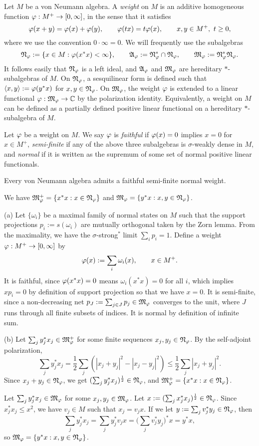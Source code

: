 \documentclass{../../large}
\begin{document}
\begin{prb}[Weights]
Let $M$ be a von Neumann algebra.
A \emph{weight} on $M$ is an additive homogeneous function $\varphi:M^+\to[0,\infty]$, in the sense that it satisfies
\[\varphi(x+y)=\varphi(x)+\varphi(y),\qquad\varphi(tx)=t\varphi(x),\qquad x,y\in M^+,\ t\ge0,\]
where we use the convention $0\cdot\infty=0$.
We will frequently use the subalgebras
\[\mathfrak{N}_\varphi:=\{x\in M:\varphi(x^*x)<\infty\},\qquad\mathfrak{A}_\varphi:=\mathfrak{N}_\varphi^*\cap\mathfrak{N}_\varphi,\qquad\mathfrak{M}_\varphi:=\mathfrak{N}_\varphi^*\mathfrak{N}_\varphi.\]
It follows easily that $\mathfrak{N}_\varphi$ is a left ideal, and $\mathfrak{A}_\varphi$ and $\mathfrak{M}_\varphi$ are hereditary $*$-subalgebras of $M$.
On $\mathfrak{N}_\varphi$, a sesquilinear form is defined such that $\langle x,y\rangle:=\varphi(y^*x)$ for $x,y\in\mathfrak{N}_\varphi$.
On $\mathfrak{M}_\varphi$, the weight $\varphi$ is extended to a linear functional $\varphi:\mathfrak{M}_\varphi\to\mathbb{C}$ by the polarization identity.
Equivalently, a weight on $M$ can be defined as a partially defined positive linear functional on a hereditary $*$-subalgebra of $M$.

Let $\varphi$ be a weight on $M$.
We say $\varphi$ is \emph{faithful} if $\varphi(x)=0$ implies $x=0$ for $x\in M^+$, \emph{semi-finite} if any of the above three subalgebras is $\sigma$-weakly dense in $M$, and \emph{normal} if it is written as the supremum of some set of normal positive linear functionals.
\begin{parts}
\item Every von Neumann algebra admits a faithful semi-finite normal weight.
\item We have $\mathfrak{M}_\varphi^+=\{x^*x:x\in\mathfrak{N}_\varphi\}$ and $\mathfrak{M}_\varphi=\{y^*x:x,y\in\mathfrak{N}_\varphi\}$.
\end{parts}
\end{prb}
\begin{pf}
(a)
Let $\{\omega_i\}$ be a maximal family of normal states on $M$ such that the support projections $p_i:=s(\omega_i)$ are mutually orthogonal taken by the Zorn lemma.
From the maximality, we have the $\sigma$-strong$^*$ limit $\sum_ip_i=1$.
Define a weight $\varphi:M^+\to[0,\infty]$ by
\[\varphi(x):=\sum_i\omega_i(x),\qquad x\in M^+.\]
It is faithful, since $\varphi(x^*x)=0$ means $\omega_i(x^*x)=0$ for all $i$, which implies $xp_i=0$ by definition of support projection so that we have $x=0$.
It is semi-finite, since a non-decreasing net $p_J:=\sum_{j\in J}p_j\in\mathfrak{M}_\varphi$ converges to the unit, where $J$ runs through all finite subsets of indices.
It is normal by definition of infinite sum.

(b)
Let $\sum_jy_j^*x_j\in\mathfrak{M}_\varphi^+$ for some finite sequences $x_j,y_j\in\mathfrak{N}_\varphi$.
By the self-adjoint polarization,
\[\sum_jy_j^*x_j=\frac12\sum_j(|x_j+y_j|^2-|x_j-y_j|^2)\le\frac12\sum_j|x_j+y_j|^2.\]
Since $x_j+y_j\in\mathfrak{N}_\varphi$, we get $(\sum_jy_j^*x_j)^{\frac12}\in\mathfrak{N}_\varphi$, and $\mathfrak{M}_\varphi^+=\{x^*x:x\in\mathfrak{N}_\varphi\}$.

Let $\sum_jy_j^*x_j\in\mathfrak{M}_\varphi$ for some $x_j,y_j\in\mathfrak{M}_\varphi$.
Let $x:=(\sum_jx_j^*x_j)^{\frac12}\in\mathfrak{N}_\varphi$.
Since $x_j^*x_j\le x^2$, we have $v_j\in M$ such that $x_j=v_jx$.
If we let $y:=\sum_jv_j^*y_j\in\mathfrak{N}_\varphi$, then
\[\sum_jy_j^*x_j=\sum_jy_j^*v_jx=\Bigr(\sum_jv_j^*y_j\Bigr)^*x=y^*x,\]
so $\mathfrak{M}_\varphi=\{y^*x:x,y\in\mathfrak{N}_\varphi\}$.
\end{pf}
\end{document}
